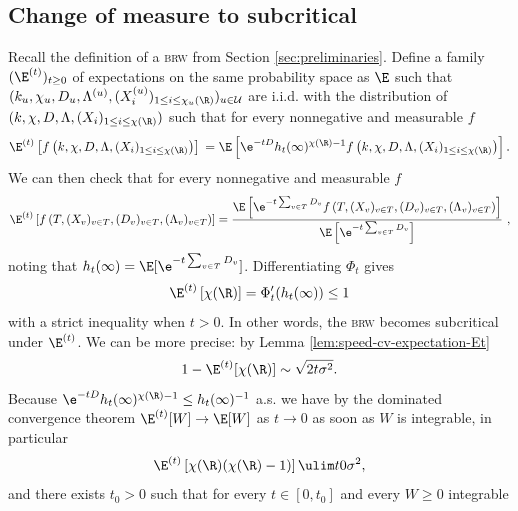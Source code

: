 \documentclass[10pt,a4paper]{article}
\newcommand{\brw}{\textsc{brw}\xspace}
\begin{document}
\subsection{Change of measure to subcritical}
\label{sec:2change-of-measure}


Recall the definition of a \brw from Section \ref{sec:preliminaries}. 
Define a family $(\E^{(t)})_{t\geq 0}$ of expectations on the same probability space as $\E$ such that $(k_u, \chi_u, D_u, \Lambda^{(u)}, (X^{(u)}_i)_{1\leq i \leq \chi_u(\R)})_{u\in \mathcal U}$ are i.i.d. with the distribution of $(k, \chi, D, \Lambda, (X_i)_{1\leq i \leq \chi(\R)})$ such that for every nonnegative and measurable $f$
\begin{equation}
\E^{(t)}\left[ f\left( k, \chi, D, \Lambda, (X_i)_{1\leq i \leq \chi(\R)} \right) \right] \\
= \E\left[ \e^{-tD} h_t(\infty)^{\chi(\R)-1} f\left( k, \chi, D, \Lambda, (X_i)_{1\leq i \leq \chi(\R)} \right) \right] .
\end{equation}
We can then check that for every nonnegative and measurable $f$
\begin{equation}
\E^{(t)}\left[ f\left( T, (X_v)_{v\in T}, (D_v)_{v\in T}, (\Lambda_v)_{v\in T} \right) \right] 
= \frac{\E\left[ \e^{-t\sum_{v\in T} D_v} f\left( T, (X_v)_{v\in T}, (D_v)_{v\in T}, (\Lambda_v)_{v\in T} \right) \right]}{\E\left[ \e^{-t\sum_{v\in T} D_v} \right]} \ ,
\end{equation}
noting that $h_t(\infty) = \E[ \e^{-t\sum_{v\in T} D_v} ]$. 
Differentiating $\Phi_t$ gives 
\begin{equation}\label{eq:2expectation-chi-vol}
\E^{(t)}\left[ \chi(\R) \right] = \Phi_t'(h_t(\infty)) \leq 1 
\end{equation}
with a strict inequality when $t>0$. 
In other words, the \brw becomes subcritical under $\E^{(t)}$. We can be more precise: by Lemma \ref{lem:speed-cv-expectation-Et} 
\begin{equation}\label{eq:asymptotic-expectation-chi-vol}
1- \E^{(t)}[ \chi(\R) ] \sim \sqrt{2t\sigma^2} .
\end{equation}
Because $\e^{-tD} h_t(\infty)^{\chi(\R)-1} \leq h_t(\infty)^{-1}$ a.s. we have by the dominated convergence theorem $\E^{(t)}[W] \to \E[W]$ as $t\to 0$ as soon as $W$ is integrable, in particular 
\begin{equation}\label{eq:2variance-chi-vol}
\E^{(t)}\left[ \chi(\R)(\chi(\R)-1) \right] \ulim t 0 \sigma^2 ,
\end{equation}
and there exists $t_0>0$ such that for every $t\in[0,t_0]$ and every $W\geq 0$ integrable 
\end{document}
